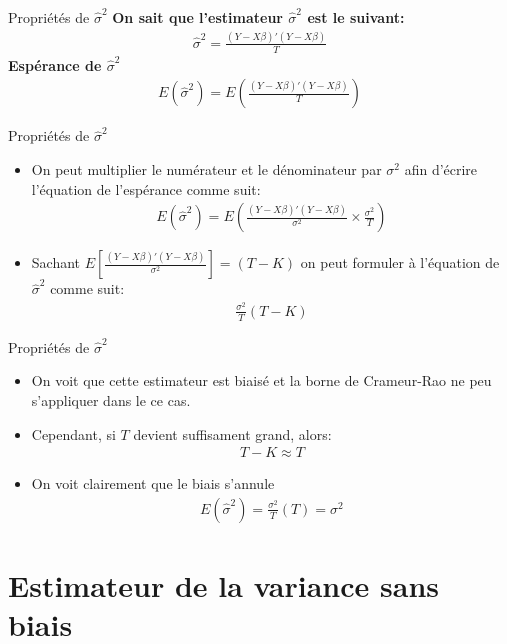 \documentclass{beamer}
\begin{document}
\begin{frame}{Propriétés de $\hat{\sigma}^2$}
\textbf{On sait que l'estimateur $\hat{\sigma}^2$ est le suivant:}
\begin{align*}
\hat{\sigma}^2=\frac{(Y-X \beta)'(Y-X \beta)}{T}
\end{align*}
\textbf{Espérance de $\hat{\sigma}^2$}
\begin{align*}
E(\hat{\sigma}^2)=E \left( \frac{(Y-X \beta)'(Y-X \beta)}{T}\right)
\end{align*}
\end{frame}

\begin{frame}{Propriétés de $\hat{\sigma}^2$}
\begin{itemize}
\item On peut multiplier le numérateur et le dénominateur par $\sigma^2$ afin d'écrire l'équation de l'espérance comme suit:
\begin{align*}
E(\hat{\sigma}^2)=E \left( \frac{(Y-X \beta)'(Y-X \beta)}{\sigma^2} \times \frac{\sigma^2}{T} \right)
\end{align*}
\item Sachant $E \left[ \frac{(Y-X \beta)'(Y-X \beta)}{\sigma^2}\right]=(T-K)$ on peut formuler à l'équation de $\hat{\sigma}^2$ comme suit:
\begin{align*}
\frac{\sigma^2}{T}(T-K)
\end{align*}
\end{itemize}
\end{frame}


\begin{frame}{Propriétés de $\hat{\sigma}^2$}
\begin{itemize}
\item On voit que cette estimateur est biaisé et la borne de Crameur-Rao ne peu s'appliquer dans le ce cas.
\item Cependant, si $T$ devient suffisament grand, alors:
\begin{align*}
T-K \approx T
\end{align*}
\item On voit clairement que le biais s'annule 
\begin{align*}
E(\hat{\sigma}^2)=\frac{\sigma^2}{T}(T)=\sigma^2
\end{align*}
\end{itemize}
\end{frame}


\section{Estimateur de la variance sans biais}
\end{document}
